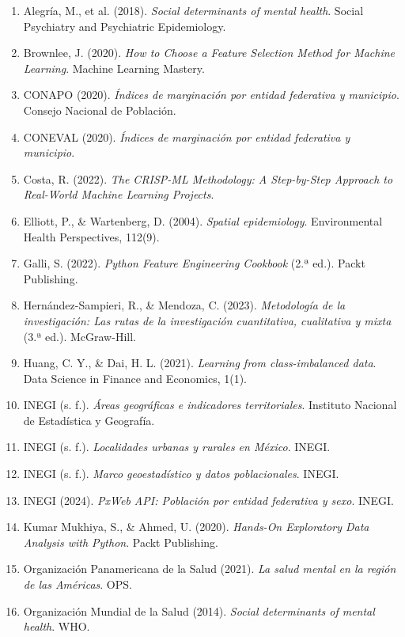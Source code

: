 \documentclass[12pt,letterpaper]{article}
\begin{document}
\begin{small}
\begin{enumerate}[leftmargin=*]
    \item Alegría, M., et al. (2018). \textit{Social determinants of mental health}. Social Psychiatry and Psychiatric Epidemiology.
    \item Brownlee, J. (2020). \textit{How to Choose a Feature Selection Method for Machine Learning}. Machine Learning Mastery.
    \item CONAPO (2020). \textit{Índices de marginación por entidad federativa y municipio}. Consejo Nacional de Población.
    \item CONEVAL (2020). \textit{Índices de marginación por entidad federativa y municipio}.
    \item Costa, R. (2022). \textit{The CRISP-ML Methodology: A Step-by-Step Approach to Real-World Machine Learning Projects}.
    \item Elliott, P., \& Wartenberg, D. (2004). \textit{Spatial epidemiology}. Environmental Health Perspectives, 112(9).
    \item Galli, S. (2022). \textit{Python Feature Engineering Cookbook} (2.ª ed.). Packt Publishing.
    \item Hernández-Sampieri, R., \& Mendoza, C. (2023). \textit{Metodología de la investigación: Las rutas de la investigación cuantitativa, cualitativa y mixta} (3.ª ed.). McGraw-Hill.
    \item Huang, C. Y., \& Dai, H. L. (2021). \textit{Learning from class-imbalanced data}. Data Science in Finance and Economics, 1(1).
    \item INEGI (s. f.). \textit{Áreas geográficas e indicadores territoriales}. Instituto Nacional de Estadística y Geografía.
    \item INEGI (s. f.). \textit{Localidades urbanas y rurales en México}. INEGI.
    \item INEGI (s. f.). \textit{Marco geoestadístico y datos poblacionales}. INEGI.
    \item INEGI (2024). \textit{PxWeb API: Población por entidad federativa y sexo}. INEGI.
    \item Kumar Mukhiya, S., \& Ahmed, U. (2020). \textit{Hands-On Exploratory Data Analysis with Python}. Packt Publishing.
    \item Organización Panamericana de la Salud (2021). \textit{La salud mental en la región de las Américas}. OPS.
    \item Organización Mundial de la Salud (2014). \textit{Social determinants of mental health}. WHO.

\end{enumerate}
\end{small}
\end{document}
